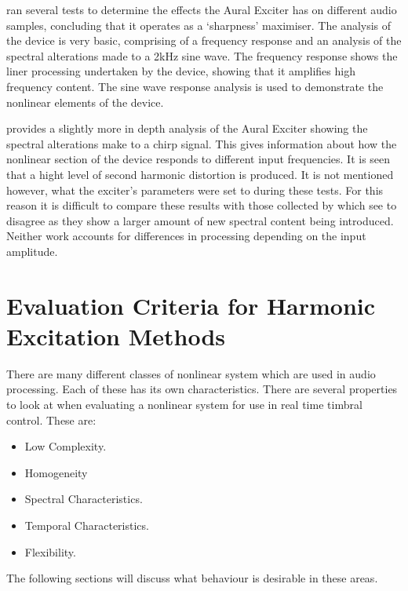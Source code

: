 		\citet{chalupper2000aural} ran several tests to determine the effects the Aural Exciter has on different
		audio samples, concluding that it operates as a `sharpness' maximiser. The analysis of the device is very
		basic, comprising of a frequency response and an analysis of the spectral alterations made to a 2kHz sine
		wave. The frequency response shows the liner processing undertaken by the device, showing that it amplifies
		high frequency content. The sine wave response analysis is used to demonstrate the nonlinear elements of
		the device. 

		\citet{dutilleux2011nonlinear} provides a slightly more in depth analysis of the Aural Exciter showing the
		spectral alterations make to a chirp signal. This gives information about how the nonlinear section of the
		device responds to different input frequencies. It is seen that a hight level of second harmonic distortion
		is produced. It is not mentioned however, what the exciter's parameters were set to during these tests. For
		this reason it is difficult to compare these results with those collected by \citet{chalupper2000aural}
		which see to disagree as they show a larger amount of new spectral content being introduced. Neither work
		accounts for differences in processing depending on the input amplitude.

\section{Evaluation Criteria for Harmonic Excitation Methods} %
\label{sec:Excitation-Evaluation}
	There are many different classes of nonlinear system which are used in audio processing. Each of these has its own
	characteristics. There are several properties to look at when evaluating a nonlinear system for use in real time
	timbral control. These are:

	\begin{itemize}
		\item Low Complexity.
		\item Homogeneity
		\item Spectral Characteristics.
		\item Temporal Characteristics.
		\item Flexibility.
	\end{itemize}

	The following sections will discuss what behaviour is desirable in these areas.

